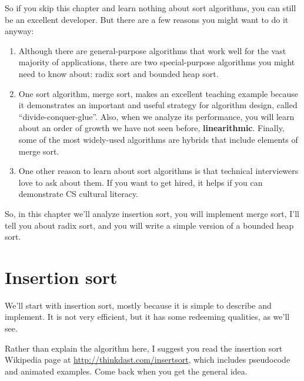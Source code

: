 \documentclass[12pt]{book}
\theoremstyle{exercise}
\begin{document}

So if you skip this chapter and learn nothing about sort algorithms,
you can still be an excellent developer. But there are a few reasons
you might want to do it anyway:

\begin{enumerate}

\item
  Although there are general-purpose algorithms that work well for the
  vast majority of applications, there are two special-purpose
  algorithms you might need to know about: radix sort and bounded heap
  sort.

\item
  One sort algorithm, merge sort, makes an excellent teaching example
  because it demonstrates an important and useful strategy for
  algorithm design, called ``divide-conquer-glue''. Also, when we
  analyze its performance, you will learn about an order of growth we
  have not seen before, {\bf linearithmic}. Finally, some of the most
  widely-used algorithms are hybrids that include elements of merge
  sort.

\item
  One other reason to learn about sort algorithms is that technical
  interviewers love to ask about them. If you want to get hired, it
  helps if you can demonstrate CS cultural literacy.

\end{enumerate}

So, in this chapter we'll analyze insertion sort, you will implement merge
sort, I'll tell you about radix sort, and you will write a simple
version of a bounded heap sort.



\section{Insertion sort}
\label{insertion-sort}

We'll start with insertion sort, mostly because it is simple to describe
and implement. It is not very efficient, but it has some redeeming
qualities, as we'll see.


Rather than explain the algorithm here, I suggest you read the
insertion sort Wikipedia page at
\url{http://thinkdast.com/insertsort}, which includes
pseudocode and animated examples. Come back when you get the general
idea.
\end{document}
